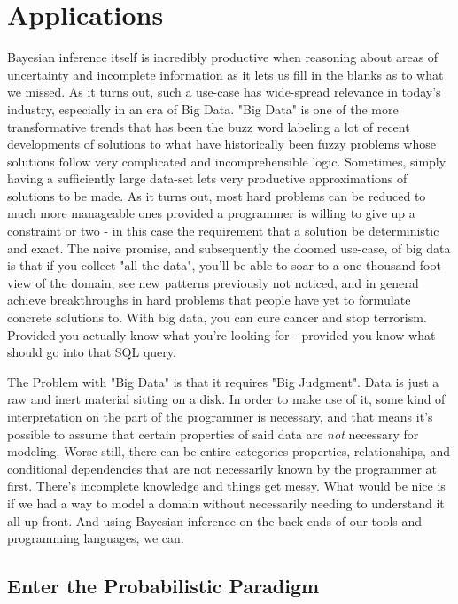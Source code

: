 \documentclass[a4paper,12pt]{article}
\begin{document}
\section{Applications}

Bayesian inference itself is incredibly productive when reasoning about areas of uncertainty and incomplete information as it lets us fill in the blanks as to what we missed. As it turns out, such a use-case has wide-spread relevance in today's industry, especially in an era of Big Data. "Big Data" is one of the more transformative trends that has been the buzz word labeling a lot of recent developments of solutions to what have historically been fuzzy problems whose solutions follow very complicated and incomprehensible logic. Sometimes, simply having a sufficiently large data-set lets very productive approximations of solutions to be made. As it turns out, most hard problems can be reduced to much more manageable ones provided a programmer is willing to give up a constraint or two - in this case the requirement that a solution be deterministic and exact. The naive promise, and subsequently the doomed use-case, of big data is that if you collect "all the data", you'll be able to soar to a one-thousand foot view of the domain, see new patterns previously not noticed, and in general achieve breakthroughs in hard problems that people have yet to formulate concrete solutions to. With big data, you can cure cancer and stop terrorism. Provided you actually know what you're looking for - provided you know what should go into that SQL query. 

The Problem with "Big Data" is that it requires "Big Judgment". Data is just a raw and inert material sitting on a disk. In order to make use of it, some kind of interpretation on the part of the programmer is necessary, and that means it's possible to assume that certain properties of said data are \emph{not} necessary for modeling. Worse still, there can be entire categories properties, relationships, and conditional dependencies that are not necessarily known by the programmer at first. There's incomplete knowledge and things get messy. What would be nice is if we had a way to model a domain without necessarily needing to understand it all up-front. And using Bayesian inference on the back-ends of our tools and programming languages, we can.

\subsection{Enter the Probabilistic Paradigm}
\end{document}
